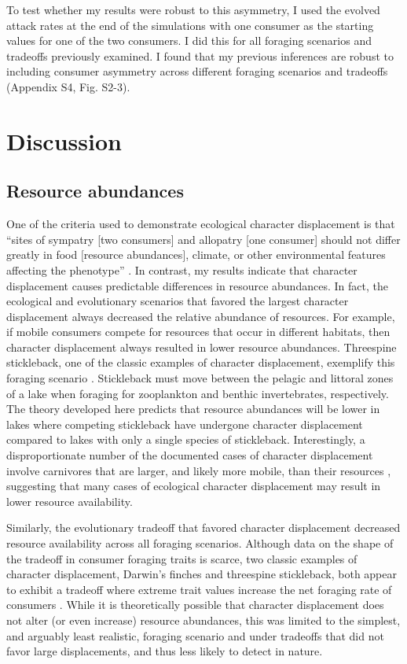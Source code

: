 \documentclass[11pt,]{article}
\begin{document}
To test whether my results were robust to this asymmetry, I used the
evolved attack rates at the end of the simulations with one consumer as
the starting values for one of the two consumers. I did this for all
foraging scenarios and tradeoffs previously examined. I found that my
previous inferences are robust to including consumer asymmetry across
different foraging scenarios and tradeoffs (Appendix S4, Fig. S2-3).

\section{Discussion}\label{discussion}

\subsection{Resource abundances}\label{resource-abundances}

One of the criteria used to demonstrate ecological character
displacement is that ``sites of sympatry {[}two consumers{]} and
allopatry {[}one consumer{]} should not differ greatly in food
\(\textbf{[}\)resource abundances\(\textbf{]}\), climate, or other
environmental features affecting the phenotype'' \citep{Schluter1992}.
In contrast, my results indicate that character displacement causes
predictable differences in resource abundances. In fact, the ecological
and evolutionary scenarios that favored the largest character
displacement always decreased the relative abundance of resources. For
example, if mobile consumers compete for resources that occur in
different habitats, then character displacement always resulted in lower
resource abundances. Threespine stickleback, one of the classic examples
of character displacement, exemplify this foraging scenario
\citep{Schluter1992, Schluter2000}. Stickleback must move between the
pelagic and littoral zones of a lake when foraging for zooplankton and
benthic invertebrates, respectively. The theory developed here predicts
that resource abundances will be lower in lakes where competing
stickleback have undergone character displacement compared to lakes with
only a single species of stickleback. Interestingly, a disproportionate
number of the documented cases of character displacement involve
carnivores \citep{Schluter2000} that are larger, and likely more mobile,
than their resources \citep{McCann2005}, suggesting that many cases of
ecological character displacement may result in lower resource
availability.

Similarly, the evolutionary tradeoff that favored character displacement
decreased resource availability across all foraging scenarios. Although
data on the shape of the tradeoff in consumer foraging traits is scarce,
two classic examples of character displacement, Darwin's finches and
threespine stickleback, both appear to exhibit a tradeoff where extreme
trait values increase the net foraging rate of consumers
\citep{Schluter1985, Arnegard2014}. While it is theoretically possible
that character displacement does not alter (or even increase) resource
abundances, this was limited to the simplest, and arguably least
realistic, foraging scenario and under tradeoffs that did not favor
large displacements, and thus less likely to detect in nature.
\end{document}

